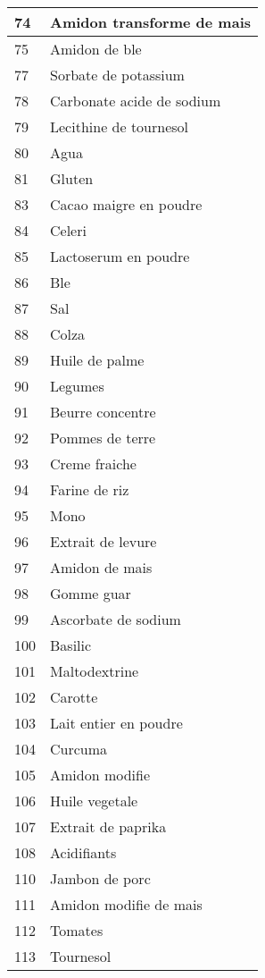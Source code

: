 \begin{longtable}{|l|l|}
74 & Amidon transforme de mais \\ \hline 
75 & Amidon de ble \\ \hline 
77 & Sorbate de potassium \\ \hline 
78 & Carbonate acide de sodium \\ \hline 
79 & Lecithine de tournesol \\ \hline 
80 & Agua \\ \hline 
81 & Gluten \\ \hline 
83 & Cacao maigre en poudre \\ \hline 
84 & Celeri \\ \hline 
85 & Lactoserum en poudre \\ \hline 
86 & Ble \\ \hline 
87 & Sal \\ \hline 
88 & Colza \\ \hline 
89 & Huile de palme \\ \hline 
90 & Legumes \\ \hline 
91 & Beurre concentre \\ \hline 
92 & Pommes de terre \\ \hline 
93 & Creme fraiche \\ \hline 
94 & Farine de riz \\ \hline 
95 & Mono \\ \hline 
96 & Extrait de levure \\ \hline 
97 & Amidon de mais \\ \hline 
98 & Gomme guar \\ \hline 
99 & Ascorbate de sodium \\ \hline 
100 & Basilic \\ \hline 
101 & Maltodextrine \\ \hline 
102 & Carotte \\ \hline 
103 & Lait entier en poudre \\ \hline 
104 & Curcuma \\ \hline 
105 & Amidon modifie \\ \hline 
106 & Huile vegetale \\ \hline 
107 & Extrait de paprika \\ \hline 
108 & Acidifiants \\ \hline 
110 & Jambon de porc \\ \hline 
111 & Amidon modifie de mais \\ \hline 
112 & Tomates \\ \hline 
113 & Tournesol \\ \hline 

\end{longtable}
